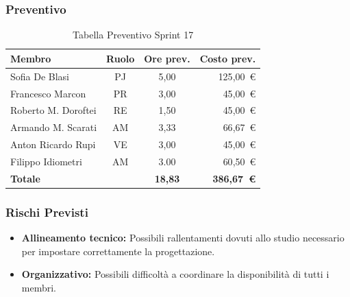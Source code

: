\subsubsection{Preventivo}
\begin{table}[H]
    \centering
    \renewcommand{\arraystretch}{1.3}
    \begin{tabularx}{\textwidth}{|X|c|c|r|}
        \hline
        \textbf{Membro} & \textbf{Ruolo} & \textbf{Ore prev.} & \textbf{Costo prev.} \\
        \hline
        Sofia De Blasi       & PJ & 5,00 & 125{,}00~\euro \\
        Francesco Marcon     & PR & 3,00 & 45{,}00~\euro \\
        Roberto M. Doroftei  & RE & 1,50 & 45{,}00~\euro \\
        Armando M. Scarati   & AM & 3,33 & 66{,}67~\euro \\
        Anton Ricardo Rupi   & VE & 3,00 & 45{,}00~\euro \\
        Filippo Idiometri    & AM & 3.00 & 60{,}50~\euro \\
        \hline
        \textbf{Totale}      &    & \textbf{18,83} & \textbf{386,67~\euro} \\
        \hline
    \end{tabularx}
    \caption{Tabella Preventivo Sprint 17} 
\end{table}

\subsubsection{Rischi Previsti}
\begin{itemize}
    \item \textbf{Allineamento tecnico:} Possibili rallentamenti dovuti allo studio necessario per impostare correttamente la progettazione.
    \item \textbf{Organizzativo:} Possibili difficoltà a coordinare la disponibilità di tutti i membri.
\end{itemize}

